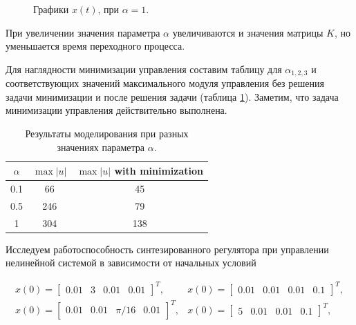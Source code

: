 \begin{figure}[!h]
\caption{Графики $x(t)$, при $\alpha = 1$.}
\label{4_3_3}
\end{figure}

При увеличении значения параметра $\alpha$ увеличиваются и значения матрицы $K$, но уменьшается время переходного процесса.

Для наглядности минимизации управления составим таблицу для $\alpha_{1,2,3}$ и соответствующих значений максимального модуля управления без решения задачи минимизации и после решения задачи (таблица \ref{4_tab_3}). Заметим, что задача минимизации управления действительно выполнена.

\begin{table}[h]
\centering
\caption{Результаты моделирования при разных значениях параметра $\alpha$.}
\label{4_tab_3}
\begin{tabular}{ccc}
\toprule
$\alpha$ & $\max |u|$ & $\max |u|$ with minimization\\
\midrule
0.1  &  66  &  45  \\
0.5  &  246  &  79   \\
1 &  304  &  138 \\ 
\bottomrule
\end{tabular}
\end{table}


Исследуем работоспособность синтезированного регулятора при управлении нелинейной системой в зависимости от начальных условий


\begin{equation*}
  \begin{matrix}
      x(0) = \begin{bmatrix}
          0.01 & 3 & 0.01 & 0.01
      \end{bmatrix}^T, & x(0) = \begin{bmatrix}
          0.01 & 0.01 & 0.01 & 0.1
      \end{bmatrix}^T,\\
      x(0) = \begin{bmatrix}
          0.01 & 0.01 & \pi /16 & 0.01
      \end{bmatrix}^T, & x(0) = \begin{bmatrix}
          5 & 0.01 & 0.01 & 0.1
      \end{bmatrix}^T,\\ 
 \end{matrix}
\end{equation*}

